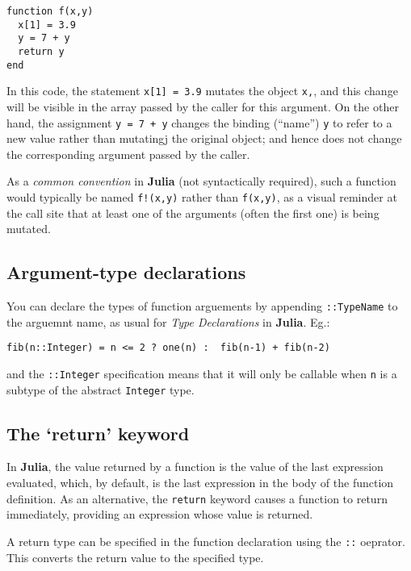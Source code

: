 \documentclass[
]{article}
\begin{document}
\begin{verbatim}
function f(x,y)
  x[1] = 3.9
  y = 7 + y
  return y
end
\end{verbatim}

In this code, the statement \texttt{x{[}1{]}\ =\ 3.9} mutates the object
\texttt{x,}, and this change will be visible in the array passed by the
caller for this argument. On the other hand, the assignment
\texttt{y\ =\ 7\ +\ y} changes the binding (``name'') \texttt{y} to
refer to a new value rather than mutatingj the original object; and
hence does not change the corresponding argument passed by the caller.

As a \emph{common convention} in \textbf{Julia} (not syntactically
required), such a function would typically be named \texttt{f!(x,y)}
rather than \texttt{f(x,y)}, as a visual reminder at the call site that
at least one of the arguments (often the first one) is being mutated.

\hypertarget{argument-type-declarations}{%
\subsection{Argument-type
declarations}\label{argument-type-declarations}}

You can declare the types of function arguements by appending
\texttt{::TypeName} to the arguemnt name, as usual for \emph{Type
Declarations} in \textbf{Julia}. Eg.:

\begin{verbatim}
fib(n::Integer) = n <= 2 ? one(n) :  fib(n-1) + fib(n-2)
\end{verbatim}

and the \texttt{::Integer} specification means that it will only be
callable when \texttt{n} is a subtype of the abstract \texttt{Integer}
type.

\hypertarget{the-return-keyword}{%
\subsection{The `return' keyword}\label{the-return-keyword}}

In \textbf{Julia}, the value returned by a function is the value of the
last expression evaluated, which, by default, is the last expression in
the body of the function definition. As an alternative, the
\texttt{return} keyword causes a function to return immediately,
providing an expression whose value is returned.

A return type can be specified in the function declaration using the
\texttt{::} oeprator. This converts the return value to the specified
type.
\end{document}
